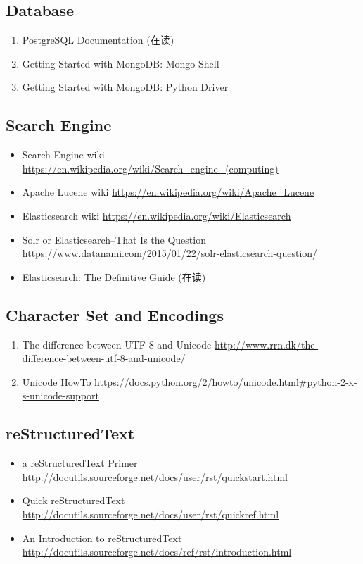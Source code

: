 \documentclass{article}
\begin{document}
\subsection{Database}
\begin{enumerate}
    \item PostgreSQL Documentation (在读)
    \item Getting Started with MongoDB: Mongo Shell
    \item Getting Started with MongoDB: Python Driver
\end{enumerate}
%
\subsection{Search Engine}
%
\begin{itemize}
    \item Search Engine wiki \url{https://en.wikipedia.org/wiki/Search_engine_(computing)}
    \item Apache Lucene wiki \url{https://en.wikipedia.org/wiki/Apache_Lucene}
    \item Elasticsearch wiki \url{https://en.wikipedia.org/wiki/Elasticsearch}
    \item Solr or Elasticsearch–That Is the Question \url{https://www.datanami.com/2015/01/22/solr-elasticsearch-question/}
    \item Elasticsearch: The Definitive Guide (在读)
\end{itemize}
\subsection{Character Set and Encodings}
\begin{enumerate}
    \item The difference between UTF-8 and Unicode \url{http://www.rrn.dk/the-difference-between-utf-8-and-unicode/}
    \item Unicode HowTo \url{https://docs.python.org/2/howto/unicode.html#python-2-x-s-unicode-support}
\end{enumerate}
%
\subsection{reStructuredText}
\begin{itemize}
    \item a reStructuredText Primer \url{http://docutils.sourceforge.net/docs/user/rst/quickstart.html}
    \item Quick reStructuredText \url{http://docutils.sourceforge.net/docs/user/rst/quickref.html}
    \item An Introduction to reStructuredText \url{http://docutils.sourceforge.net/docs/ref/rst/introduction.html}
\end{itemize}
%
\end{document}
